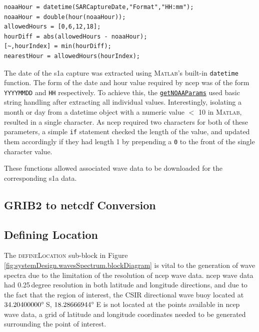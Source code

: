 \begin{lstlisting}[caption={Initial implementation of \textsc{Matlab} code to extract wave parameters at certain geographical location.},label={code:waveSpec.download.closestHour}]
noaaHour = datetime(SARCaptureDate,"Format","HH:mm");
noaaHour = double(hour(noaaHour));
allowedHours = [0,6,12,18];
hourDiff = abs(allowedHours - noaaHour);
[~,hourIndex] = min(hourDiff);
nearestHour = allowedHours(hourIndex);
\end{lstlisting}

The date of the \acs{s1a} capture was extracted using \textsc{Matlab}'s built-in \lstinline{datetime} function. The form of the date and hour value required by \acs{ncep} was of the form \texttt{YYYYMMDD} and \texttt{HH} respectively. To achieve this, the \href{https://github.com/JNSRYA006/sar-parameter-extraction-pipeline/blob/main/functions/waveSpectra/generateSingleJONSWAP.m}{\lstinline{getNOAAParams}} used basic string handling after extracting all individual values. Interestingly, isolating a month or day from a datetime object with a numeric value $<$ 10 in \textsc{Matlab}, resulted in a single character. As \acs{ncep} required two characters for both of these parameters, a simple \lstinline{if} statement checked the length of the value, and updated them accordingly if they had length 1 by prepending a \texttt{0} to the front of the single character value.

These functions allowed associated wave data to be downloaded for the corresponding \acs{s1a} data.


\subsection{GRIB2 to \acs{netcdf} Conversion} \label{subsec:systemDesign.waveSpectrum.toNetCDF}

\subsection{Defining Location} \label{subsec:systemDesign.defineLocation}

The \textsc{defineLocation} sub-block in Figure \ref{fig:systemDesign.wavesSpectrum.blockDiagram} is vital to the generation of wave spectra due to the limitation of the resolution of \acs{ncep} wave data. \acs{ncep} wave data had 0.25\,degree resolution in both latitude and longitude directions, and due to the fact that the region of interest, the CSIR directional wave buoy located at $34.20400000\degree$\,S, $18.28666944\degree$\,E is not located at the points available in \acs{ncep} wave data, a grid of latitude and longitude coordinates needed to be generated surrounding the point of interest. 

